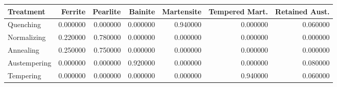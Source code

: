 \begin{tabular}{lrrrrrr}
\toprule
Treatment & Ferrite & Pearlite & Bainite & Martensite & Tempered Mart. & Retained Aust. \\
\midrule
Quenching & 0.000000 & 0.000000 & 0.000000 & 0.940000 & 0.000000 & 0.060000 \\
Normalizing & 0.220000 & 0.780000 & 0.000000 & 0.000000 & 0.000000 & 0.000000 \\
Annealing & 0.250000 & 0.750000 & 0.000000 & 0.000000 & 0.000000 & 0.000000 \\
Austempering & 0.000000 & 0.000000 & 0.920000 & 0.000000 & 0.000000 & 0.080000 \\
Tempering & 0.000000 & 0.000000 & 0.000000 & 0.000000 & 0.940000 & 0.060000 \\
\bottomrule
\end{tabular}
